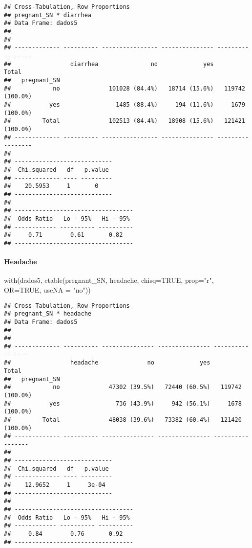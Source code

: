 \documentclass[
]{article}
\newenvironment{Shaded}{\begin{snugshade}}{\end{snugshade}}
\newcommand{\AttributeTok}[1]{\textcolor[rgb]{0.77,0.63,0.00}{#1}}
\newcommand{\ConstantTok}[1]{\textcolor[rgb]{0.00,0.00,0.00}{#1}}
\newcommand{\FunctionTok}[1]{\textcolor[rgb]{0.00,0.00,0.00}{#1}}
\newcommand{\NormalTok}[1]{#1}
\newcommand{\StringTok}[1]{\textcolor[rgb]{0.31,0.60,0.02}{#1}}
\begin{document}
\begin{verbatim}
## Cross-Tabulation, Row Proportions  
## pregnant_SN * diarrhea  
## Data Frame: dados5  
## 
## 
## ------------- ---------- ---------------- --------------- -----------------
##                 diarrhea               no             yes             Total
##   pregnant_SN                                                              
##            no              101028 (84.4%)   18714 (15.6%)   119742 (100.0%)
##           yes                1485 (88.4%)     194 (11.6%)     1679 (100.0%)
##         Total              102513 (84.4%)   18908 (15.6%)   121421 (100.0%)
## ------------- ---------- ---------------- --------------- -----------------
## 
## ----------------------------
##  Chi.squared   df   p.value 
## ------------- ---- ---------
##    20.5953     1       0    
## ----------------------------
## 
## ----------------------------------
##  Odds Ratio   Lo - 95%   Hi - 95% 
## ------------ ---------- ----------
##     0.71        0.61       0.82   
## ----------------------------------
\end{verbatim}

\hypertarget{headache}{%
\paragraph{\texorpdfstring{{ Headache }}{ Headache }}\label{headache}}

\begin{Shaded}
\begin{Highlighting}[]
\FunctionTok{with}\NormalTok{(dados5, }\FunctionTok{ctable}\NormalTok{(pregnant\_SN, headache, }\AttributeTok{chisq=}\ConstantTok{TRUE}\NormalTok{, }\AttributeTok{prop=}\StringTok{"r"}\NormalTok{, }\AttributeTok{OR=}\ConstantTok{TRUE}\NormalTok{, }\AttributeTok{useNA =} \StringTok{"no"}\NormalTok{))}
\end{Highlighting}
\end{Shaded}

\begin{verbatim}
## Cross-Tabulation, Row Proportions  
## pregnant_SN * headache  
## Data Frame: dados5  
## 
## 
## ------------- ---------- --------------- --------------- -----------------
##                 headache              no             yes             Total
##   pregnant_SN                                                             
##            no              47302 (39.5%)   72440 (60.5%)   119742 (100.0%)
##           yes                736 (43.9%)     942 (56.1%)     1678 (100.0%)
##         Total              48038 (39.6%)   73382 (60.4%)   121420 (100.0%)
## ------------- ---------- --------------- --------------- -----------------
## 
## ----------------------------
##  Chi.squared   df   p.value 
## ------------- ---- ---------
##    12.9652     1     3e-04  
## ----------------------------
## 
## ----------------------------------
##  Odds Ratio   Lo - 95%   Hi - 95% 
## ------------ ---------- ----------
##     0.84        0.76       0.92   
## ----------------------------------
\end{verbatim}
\end{document}

